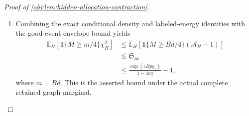 \begin{proof}[Proof of \cref{obj:lem:hidden-allocation-contraction}]
\begin{enumerate}
The detailed retained graph generated by a partition and audit array is
\[
H(S,W)
:=
\{(j,i):
\exists\ell,\ j\in S_\ell,\ i\in C_\ell,\ W_{ji}=1\}.
\]
Averaging the fixed-partition inequality over the uniform partition law thus averages over the actual marginal of this full graph:
\[
\begin{aligned}
\mathbb E_H\!\left[
\mathbf1\{M\ge Bd/4\}(\mathcal A_H-1)
\right]
&=
\mathbb E_S\!\left[
\mathbb E\!\left[
\mathbf1\{M\ge Bd/4\}(\mathcal A_{H(S,W)}-1)
\mid S
\right]\right]
\\
&\le\mathfrak S_{\mathrm{nc}}.
\end{aligned}
\]
This average includes every source label and every retained-edge subset.

\item Combining the exact conditional density and labeled-energy identities with the good-event envelope bound yields
\[
\begin{aligned}
\mathbb E_H\!\left[
\mathbf1\{M\ge m/4\}\chi_H^2
\right]
&\le
\mathbb E_H\!\left[
\mathbf1\{M\ge Bd/4\}(\mathcal A_H-1)
\right]
\\
&\le\mathfrak S_{\mathrm{nc}}
\\
&\le
\frac{\exp(eBp\eta_1)}{1-4e\eta}-1,
\end{aligned}
\]
where \(m=Bd\). This is the asserted bound under the actual complete retained-graph marginal.
\end{enumerate}
\end{proof}
